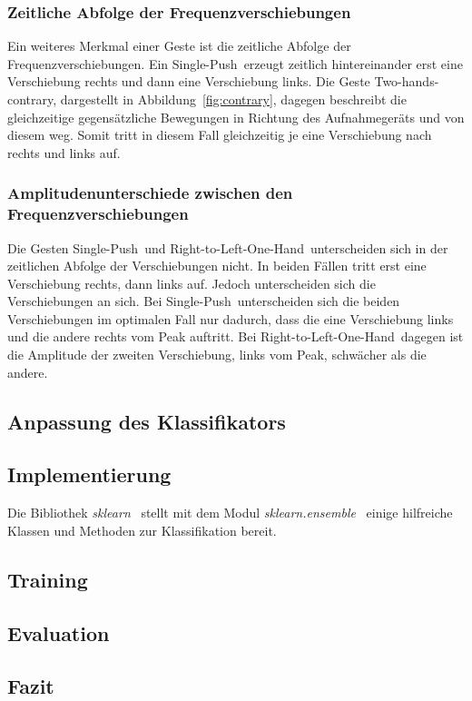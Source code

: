 \subsubsection*{Zeitliche Abfolge der Frequenzverschiebungen}
Ein weiteres Merkmal einer Geste ist die zeitliche Abfolge der Frequenzverschiebungen. Ein \glqq Single-Push\grqq\ erzeugt zeitlich hintereinander erst eine Verschiebung rechts und dann eine Verschiebung links. Die Geste \glqq Two-hands-contrary\grqq , dargestellt in Abbildung~\ref{fig:contrary}, dagegen beschreibt die gleichzeitige gegensätzliche Bewegungen in Richtung des Aufnahmegeräts und von diesem weg. Somit tritt in diesem Fall gleichzeitig je eine Verschiebung nach rechts und links auf. 


\subsubsection*{Amplitudenunterschiede zwischen den Frequenzverschiebungen}
Die Gesten \glqq Single-Push\grqq\ und \glqq Right-to-Left-One-Hand\grqq\ unterscheiden sich in der zeitlichen Abfolge der Verschiebungen nicht. In beiden Fällen tritt erst eine Verschiebung rechts, dann links auf. Jedoch unterscheiden sich die Verschiebungen an sich. Bei \glqq Single-Push\grqq\ unterscheiden sich die beiden Verschiebungen im optimalen Fall nur dadurch, dass die eine Verschiebung links und die andere rechts vom Peak auftritt. Bei \glqq Right-to-Left-One-Hand\grqq\ dagegen ist die Amplitude der zweiten Verschiebung, links vom Peak, schwächer als die andere.

\subsection{Anpassung des Klassifikators}

\subsection{Implementierung}

Die Bibliothek \textit{sklearn}~\cite{sklearn} stellt mit dem Modul \textit{sklearn.ensemble}~\cite{sklearn.ensemble} einige hilfreiche Klassen und Methoden zur Klassifikation bereit.

\subsection{Training}

\subsection{Evaluation}

\subsection{Fazit}


